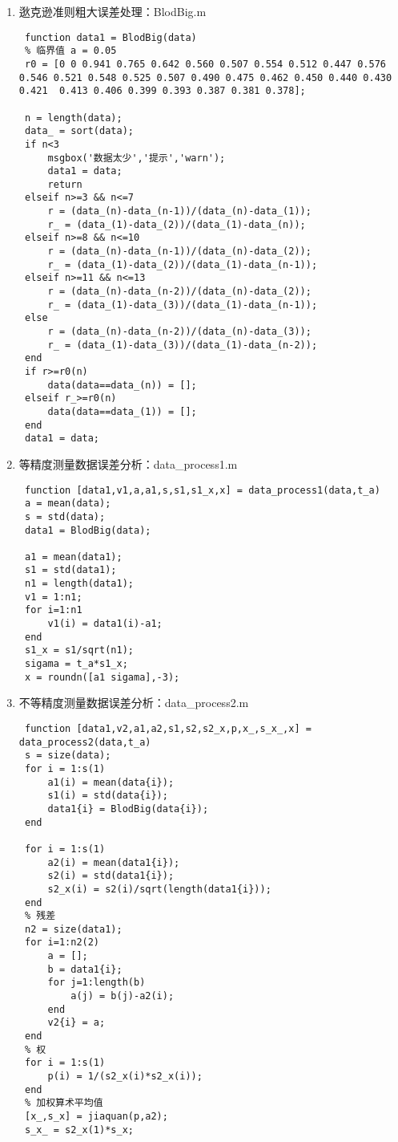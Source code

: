 \begin{enumerate}
	\item 逖克逊准则粗大误差处理：BlodBig.m
	\begin{lstlisting}
 function data1 = BlodBig(data)
 % 临界值 a = 0.05
 r0 = [0 0 0.941 0.765 0.642 0.560 0.507 0.554 0.512 0.447 0.576 0.546 0.521 0.548 0.525 0.507 0.490 0.475 0.462 0.450 0.440 0.430 0.421  0.413 0.406 0.399 0.393 0.387 0.381 0.378];
 
 n = length(data);
 data_ = sort(data);
 if n<3
     msgbox('数据太少','提示','warn');
     data1 = data;
     return
 elseif n>=3 && n<=7
     r = (data_(n)-data_(n-1))/(data_(n)-data_(1));
     r_ = (data_(1)-data_(2))/(data_(1)-data_(n));
 elseif n>=8 && n<=10
     r = (data_(n)-data_(n-1))/(data_(n)-data_(2));
     r_ = (data_(1)-data_(2))/(data_(1)-data_(n-1));
 elseif n>=11 && n<=13
     r = (data_(n)-data_(n-2))/(data_(n)-data_(2));
     r_ = (data_(1)-data_(3))/(data_(1)-data_(n-1));
 else
     r = (data_(n)-data_(n-2))/(data_(n)-data_(3));
     r_ = (data_(1)-data_(3))/(data_(1)-data_(n-2));
 end
 if r>=r0(n)
     data(data==data_(n)) = [];
 elseif r_>=r0(n)
     data(data==data_(1)) = [];
 end
 data1 = data;\end{lstlisting}
	\item 等精度测量数据误差分析：data\_process1.m
	\begin{lstlisting}
 function [data1,v1,a,a1,s,s1,s1_x,x] = data_process1(data,t_a)
 a = mean(data);
 s = std(data);
 data1 = BlodBig(data);
 
 a1 = mean(data1);
 s1 = std(data1);
 n1 = length(data1);
 v1 = 1:n1;
 for i=1:n1
     v1(i) = data1(i)-a1;
 end
 s1_x = s1/sqrt(n1);
 sigama = t_a*s1_x;
 x = roundn([a1 sigama],-3);\end{lstlisting}
	\item 不等精度测量数据误差分析：data\_process2.m
	\begin{lstlisting}
 function [data1,v2,a1,a2,s1,s2,s2_x,p,x_,s_x_,x] = data_process2(data,t_a)
 s = size(data);
 for i = 1:s(1)
     a1(i) = mean(data{i});
     s1(i) = std(data{i});
     data1{i} = BlodBig(data{i});
 end
 
 for i = 1:s(1)
     a2(i) = mean(data1{i});
     s2(i) = std(data1{i});
     s2_x(i) = s2(i)/sqrt(length(data1{i}));
 end
 % 残差
 n2 = size(data1);
 for i=1:n2(2)
     a = [];
     b = data1{i};
     for j=1:length(b)
         a(j) = b(j)-a2(i);
     end
     v2{i} = a;
 end
 % 权
 for i = 1:s(1)
     p(i) = 1/(s2_x(i)*s2_x(i));
 end
 % 加权算术平均值
 [x_,s_x] = jiaquan(p,a2);
 s_x_ = s2_x(1)*s_x;
 

\end{lstlisting}
\end{enumerate}
